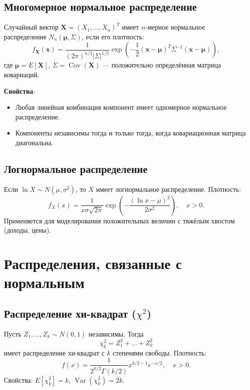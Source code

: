 \documentclass[10pt]{article}
\begin{document}
\subsection{Многомерное нормальное распределение}
\begin{definition}
Случайный вектор $\mathbf{X} = (X_1, \dots, X_n)^T$ имеет $n$-мерное нормальное распределение $N_n(\boldsymbol{\mu}, \Sigma)$, если его плотность:
\[
f_{\mathbf{X}}(\mathbf{x}) = \frac{1}{(2\pi)^{n/2} |\Sigma|^{1/2}} \exp\left(-\frac{1}{2} (\mathbf{x} - \boldsymbol{\mu})^T \Sigma^{-1} (\mathbf{x} - \boldsymbol{\mu})\right),
\]
где $\boldsymbol{\mu} = E[\mathbf{X}]$, $\Sigma = \operatorname{Cov}(\mathbf{X})$ — положительно определённая матрица ковариаций.
\end{definition}
\textbf{Свойства}:
\begin{itemize}
    \item Любая линейная комбинация компонент имеет одномерное нормальное распределение.
    \item Компоненты независимы тогда и только тогда, когда ковариационная матрица диагональна.
\end{itemize}

\subsection{Логнормальное распределение}
Если $\ln X \sim N(\mu, \sigma^2)$, то $X$ имеет логнормальное распределение. Плотность:
\[
f_X(x) = \frac{1}{x \sigma \sqrt{2\pi}} \exp\left(-\frac{(\ln x - \mu)^2}{2\sigma^2}\right), \quad x > 0.
\]
Применяется для моделирования положительных величин с тяжёлым хвостом (доходы, цены).

\section{Распределения, связанные с нормальным}

\subsection{Распределение хи-квадрат ($\chi^2$)}
\begin{definition}
Пусть $Z_1, \dots, Z_k \sim N(0,1)$ независимы. Тогда
\[
\chi^2_k = Z_1^2 + \dots + Z_k^2
\]
имеет распределение хи-квадрат с $k$ степенями свободы. Плотность:
\[
f(x) = \frac{1}{2^{k/2} \Gamma(k/2)} x^{k/2 - 1} e^{-x/2}, \quad x > 0.
\]
Свойства: $E[\chi^2_k] = k$, $\operatorname{Var}(\chi^2_k) = 2k$.
\end{definition}
\end{document}
